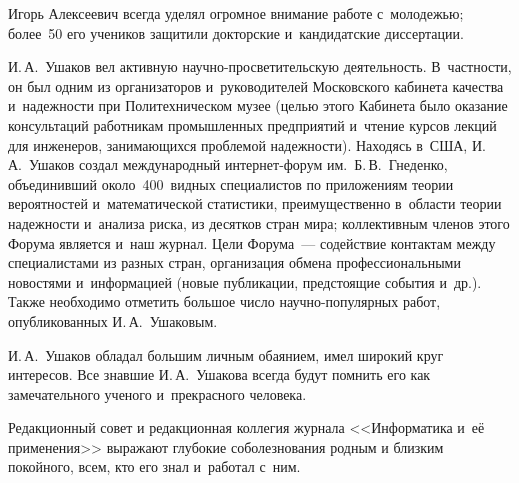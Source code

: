 Игорь Алексеевич всегда уделял огромное внимание работе с~молодежью; более~50 его учеников защитили докторские и~кандидатские диссертации.

И.\,А.~Ушаков вел активную научно-про\-све\-ти\-тель\-скую деятельность. В~частности, он был одним из организаторов и~руководителей Московского кабинета качества и~надежности при Политехническом музее (целью этого Кабинета было оказание консультаций работникам промышленных предприятий и~чтение курсов лекций для инженеров, занимающихся проблемой надежности). Находясь в~США, И.\,А.~Ушаков создал международный ин\-тер\-нет-фо\-рум им.\ Б.\,В.~Гнеденко, объединивший около~400~видных специалистов по приложениям теории вероятностей и~математической статистики, преимущественно в~об\-ласти теории надежности и~анализа риска, из десятков стран мира; коллективным членов этого Форума является и~наш журнал. Цели Форума~--- содействие контактам между специалистами из разных стран, организация обмена профессиональными 
новостями и~информацией (новые публикации, предстоящие события и~др.). Также необходимо отметить большое число на\-уч\-но-по\-пу\-ляр\-ных работ, опубликованных И.\,А.~Ушаковым.

И.\,А.~Ушаков обладал большим личным обаянием, имел широкий круг интересов. Все знавшие И.\,А.~Ушакова всегда будут помнить его как замечательного ученого и~прекрасного человека.

\bigskip

Редакционный совет и редакционная коллегия журнала <<Информатика и~её применения>> 
выражают глубокие соболезнования родным и близким покойного, всем, кто его знал и~работал с~ним.
